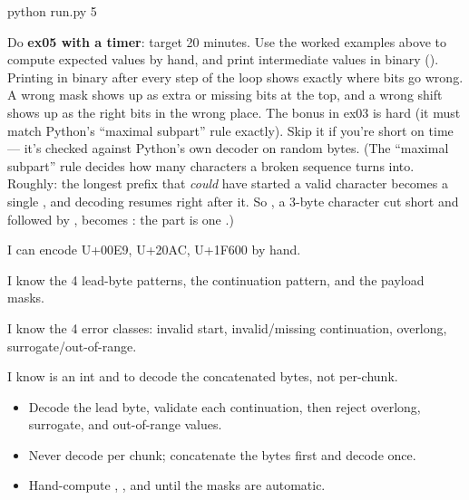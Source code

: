 \documentclass[10pt,a4paper]{article}
\begin{document}
\begin{shcode}
python run.py 5
\end{shcode}
Do \textbf{ex05 with a timer}: target 20 minutes. Use the worked examples above to compute expected values by hand, and print intermediate  values in binary ().
Printing  in binary after every step of the loop shows exactly where bits go wrong. A wrong mask shows up as extra or missing bits at the top, and a wrong shift shows up as the right bits in the wrong place.
The bonus  in ex03 is hard (it must match Python’s “maximal subpart” rule exactly). Skip it if you’re short on time — it’s checked against Python’s own decoder on random bytes.
(The “maximal subpart” rule decides how many  characters a broken sequence turns into. Roughly: the longest prefix that \emph{could} have started a valid character becomes a single , and decoding resumes right after it. So , a 3-byte character cut short and followed by , becomes : the  part is one .)
\begin{checklistbox}
\begin{checklist}
\item I can encode U+00E9, U+20AC, U+1F600 by hand.
\item I know the 4 lead-byte patterns, the continuation pattern, and the payload masks.
\item I know the 4 error classes: invalid start, invalid/missing continuation, overlong, surrogate/out-of-range.
\item I know  is an int and to decode the concatenated bytes, not per-chunk.
\end{checklist}
\scoreline
\end{checklistbox}
\begin{examlensbox}
\begin{itemize}
\item Decode the lead byte, validate each continuation, then reject overlong, surrogate, and out-of-range values.
\item Never decode per chunk; concatenate the bytes first and decode once.
\item Hand-compute , , and  until the masks are automatic.
\end{itemize}
\end{examlensbox}
\bugjournalifspace
\end{document}
